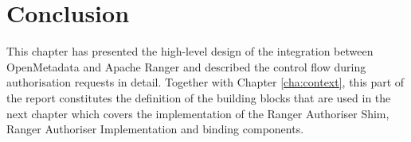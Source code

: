 \section{Conclusion}

This chapter has presented the high-level design of the integration between OpenMetadata and Apache Ranger and described the control flow during authorisation requests in detail. Together with Chapter \ref{cha:context}, this part of the report constitutes the definition of the building blocks that are used in the next chapter which covers the implementation of the Ranger Authoriser Shim, Ranger Authoriser Implementation and binding components.